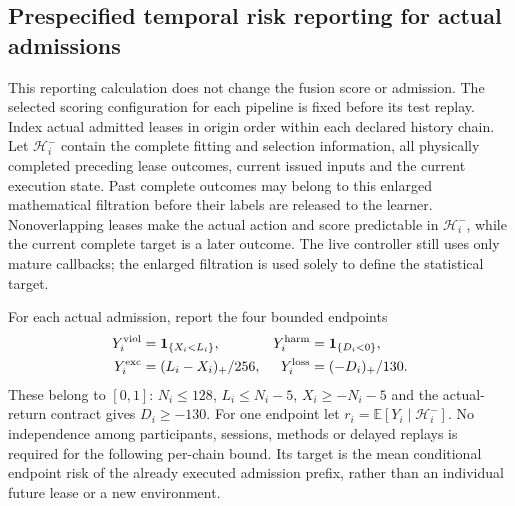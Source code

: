 \subsection{Prespecified temporal risk reporting for actual admissions}
\label{app:temporal-admission-risk-report}
This reporting calculation does not change the fusion score or admission.
The selected scoring configuration for each pipeline is fixed before its
test replay. Index actual admitted leases in origin order within each
declared history chain. Let $\mathcal H_i^-$ contain the complete fitting
and selection information, all physically completed preceding lease
outcomes, current issued inputs and the current execution state. Past
complete outcomes may belong to this enlarged mathematical filtration
before their labels are released to the learner. Nonoverlapping leases
make the actual action and score predictable in $\mathcal H_i^-$, while
the current complete target is a later outcome. The live controller still
uses only mature callbacks; the enlarged filtration is used solely to
define the statistical target.

For each actual admission, report the four bounded endpoints
\begin{equation}
 \begin{aligned}
 Y_i^{\rm viol}&=\mathbf1_{\{X_i<L_i\}},&
 Y_i^{\rm harm}&=\mathbf1_{\{D_i<0\}},\\
 Y_i^{\rm exc}&=(L_i-X_i)_+/256,&
 Y_i^{\rm loss}&=(-D_i)_+/130.
 \end{aligned}
 \label{eq:admitted-risk-four-endpoints}
\end{equation}
These belong to $[0,1]$: $N_i\leq128$, $L_i\leq N_i-5$,
$X_i\geq-N_i-5$ and the actual-return contract gives $D_i\geq-130$.
For one endpoint let
$r_i=\mathbb E[Y_i\mid\mathcal H_i^-]$. No independence among
participants, sessions, methods or delayed replays is required for the
following per-chain bound. Its target is the mean conditional endpoint
risk of the already executed admission prefix, rather than an individual
future lease or a new environment.

